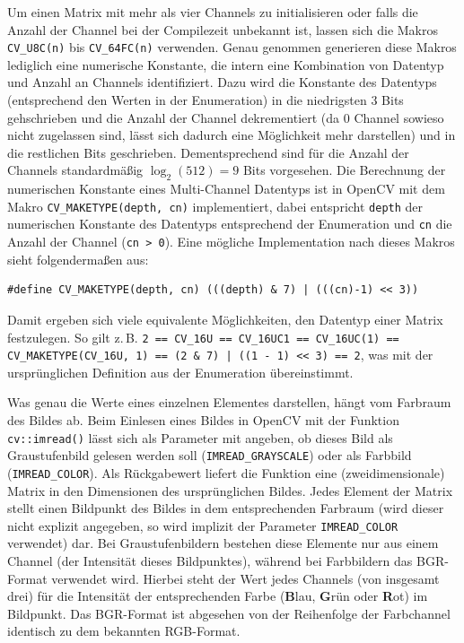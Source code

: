 \documentclass{whswinvcbook}
\begin{document}
Um einen Matrix mit mehr als vier Channels zu initialisieren oder falls die Anzahl der Channel bei der Compilezeit unbekannt ist, lassen sich die Makros \texttt{CV\_U8C(n)} bis \texttt{CV\_64FC(n)} verwenden. Genau genommen generieren diese Makros lediglich eine numerische Konstante, die intern eine Kombination von Datentyp und Anzahl an Channels identifiziert. Dazu wird die Konstante des Datentyps (entsprechend den Werten in der Enumeration) in die niedrigsten 3 Bits gehschrieben und die Anzahl der Channel dekrementiert (da $0$ Channel sowieso nicht zugelassen sind, lässt sich dadurch eine Möglichkeit mehr darstellen) und in die restlichen Bits geschrieben. Dementsprechend sind für die Anzahl der Channels standardmäßig $\log_2(512)=9$ Bits vorgesehen. Die Berechnung der numerischen Konstante eines Multi-Channel Datentyps ist in OpenCV mit dem Makro \texttt{CV\_MAKETYPE(depth, cn)} implementiert, dabei entspricht \texttt{depth} der numerischen Konstante des Datentyps entsprechend der Enumeration und \texttt{cn} die Anzahl der Channel (\texttt{cn > 0}). Eine mögliche Implementation nach \cite{opencv4} dieses Makros sieht folgendermaßen aus:
\begin{lstlisting}[numbers=none,frame=none]
#define CV_MAKETYPE(depth, cn) (((depth) & 7) | (((cn)-1) << 3))
\end{lstlisting}
Damit ergeben sich viele equivalente Möglichkeiten, den Datentyp einer Matrix festzulegen. So gilt z.\,B. \texttt{2 == CV\_16U == CV\_16UC1 == CV\_16UC(1) == CV\_MAKETYPE(CV\_16U, 1) == (2 \& 7) | ((1 - 1) << 3) == 2}, was mit der ursprünglichen Definition aus der Enumeration übereinstimmt.

Was genau die Werte eines einzelnen Elementes darstellen, hängt vom Farbraum des Bildes ab. Beim Einlesen eines Bildes in OpenCV mit der Funktion \texttt{cv::imread()} lässt sich als Parameter mit angeben, ob dieses Bild als Graustufenbild gelesen werden soll (\texttt{IMREAD\_GRAYSCALE}) oder als Farbbild (\texttt{IMREAD\_COLOR}). Als Rückgabewert liefert die Funktion eine (zweidimensionale) Matrix in den Dimensionen des ursprünglichen Bildes. Jedes Element der Matrix stellt einen Bildpunkt des Bildes in dem entsprechenden Farbraum (wird dieser nicht explizit angegeben, so wird implizit der Parameter \texttt{IMREAD\_COLOR} verwendet) dar. Bei Graustufenbildern bestehen diese Elemente nur aus einem Channel (der Intensität dieses Bildpunktes), während bei Farbbildern das BGR-Format verwendet wird. Hierbei steht der Wert jedes Channels (von insgesamt drei) für die Intensität der entsprechenden Farbe (\textbf{B}lau, \textbf{G}rün oder \textbf{R}ot) im Bildpunkt. Das BGR-Format ist abgesehen von der Reihenfolge der Farbchannel identisch zu dem bekannten RGB-Format.
\end{document}
